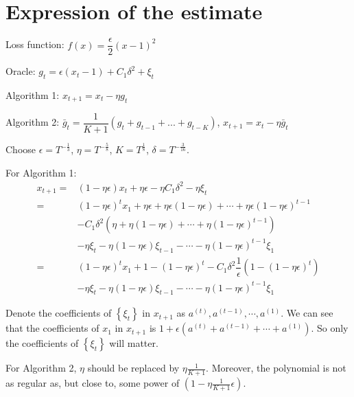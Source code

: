 \documentclass[11pt,letterpaper,english]{article}
\begin{document}
\section{Expression of the estimate}

Loss function: $f(x) = \dfrac{\epsilon}{2} (x-1)^2$

Oracle: $g_t = \epsilon (x_t-1) + C_1 \delta^2 + \xi_t$

Algorithm 1: $ x_{t+1} = x_t - \eta  g_t$

Algorithm 2: $\bar{g}_t = \dfrac{1}{K+1}  (g_t + g_{t-1} + ... + g_{t-K})$, 
$x_{t+1} = x_t - \eta  \bar{g}_t$

Choose $\epsilon = T^{-\frac{1}{3}}$, $\eta = T^{-\frac{5}{8}}$, $K = T^{\frac{1}{8}}$, $\delta=T^{-\frac{3}{16}}$.

For Algorithm 1:
\begin{align*}
x_{t+1} =& (1-\eta \epsilon) x_{t} + \eta \epsilon - \eta C_1 \delta^2-\eta \xi_{t}\\
=&  \left(1-\eta \epsilon\right)^t x_1+ \eta \epsilon+\eta \epsilon\left(1-\eta \epsilon\right)+\cdots + \eta \epsilon\left(1-\eta \epsilon\right)^{t-1}\\
&-C_1 \delta^2\left( \eta + \eta\left( 1-\eta \epsilon \right)+\cdots + \eta \left(1-\eta \epsilon\right)^{t-1} \right) \\
&-\eta \xi_t -\eta \left(1-\eta \epsilon\right)\xi_{t-1}- \cdots -\eta \left(1-\eta \epsilon\right)^{t-1}\xi_{1}\\
=& \left(1-\eta \epsilon\right)^t x_1+ 1-\left(1-\eta \epsilon \right)^t
-C_1 \delta^2 \dfrac{1}{\epsilon}\left( 1-\left(1-\eta \epsilon \right)^t \right)\\
&- \eta \xi_t -\eta \left(1-\eta \epsilon\right)\xi_{t-1}- \cdots -\eta \left(1-\eta \epsilon\right)^{t-1}\xi_{1}
\end{align*}

Denote the coefficients of $\left\lbrace\xi_t\right\rbrace$ in $x_{t+1}$ as $a^{(t)}, a^{(t-1)},\cdots,a^{(1)}$. We can see that the coefficients of $x_1$ in $x_{t+1}$ is $1+\epsilon (a^{(t)}+ a^{(t-1)}+\cdots + a^{(1)})$. So only the coefficients of $\left\lbrace\xi_t\right\rbrace$ will matter.

For Algorithm 2, $\eta$ should be replaced by $\eta \frac{1}{K+1}$. Moreover, the polynomial is not as regular as, but close to, some power of $\left(1-\eta \frac{1}{K+1} \epsilon\right)$.
\end{document}
